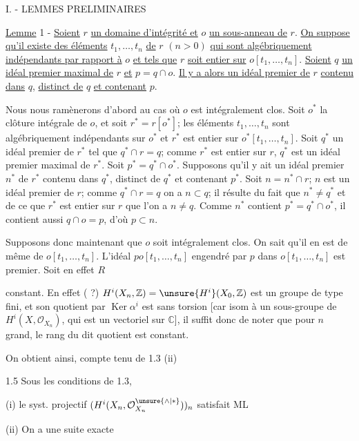 I. - LEMMES PRELIMINAIRES

\uline{Lemme} 1 - \uline{Soient} $r$ \uline{un domaine d'intégrité et} $o$ \uline{un sous-anneau de} $r$. \uline{On suppose qu'il existe des éléments} $t_1,\ldots,t_n$ \uline{de} $r$ $(n>0)$ \uline{qui sont algébriquement indépendants par rapport à} $o$ \uline{et tels que} $r$ \uline{soit entier sur} $o[t_1,\ldots,t_n]$. \uline{Soient} $q$ \uline{un idéal premier maximal de} $r$ \uline{et} $p=q\cap o$. \uline{Il y a alors un idéal premier de} $r$ \uline{contenu dans} $q$, \uline{distinct de} $q$ \uline{et contenant} $p$.

Nous nous ramènerons d'abord au cas où $o$ est intégralement clos. Soit $o^*$ la clôture intégrale de $o$, et soit $r^*=r[o^*]$; les éléments $t_1,\ldots,t_n$ sont algébriquement indépendants sur $o^*$ et $r^*$ est entier sur $o^*[t_1,\ldots,t_n]$. Soit $q^*$ un idéal premier de $r^*$ tel que $q^*\cap r=q$; comme $r^*$ est entier sur $r$, $q^*$ est un idéal premier maximal de $r^*$. Soit $p^*=q^*\cap o^*$. Supposons qu'il y ait un idéal premier $n^*$ de $r^*$ contenu dans $q^*$, distinct de $q^*$ et contenant $p^*$. Soit $n=n^*\cap r$; $n$ est un idéal premier de $r$; comme $q^*\cap r=q$ on a $n\subset q$; il résulte du fait que $n^*\ne q^*$ et de ce que $r^*$ est entier sur $r$ que l'on a $n\ne q$. Comme $n^*$ contient $p^*=q^*\cap o^*$, il contient aussi $q\cap o=p$, d'où $p\subset n$.

Supposons donc maintenant que $o$ soit intégralement clos. On sait qu'il en est de même de $o[t_1,\ldots,t_n]$. L'idéal $po[t_1,\ldots,t_n]$ engendré par $p$ dans $o[t_1,\ldots,t_n]$ est premier. Soit en effet $R$

constant. En effet ( ?) $H^i(X_n,\mathbb Z)=\unsure{H^i}(X_0,\mathbb Z)$ est un groupe de type fini, et son quotient par $\operatorname{Ker}\alpha^i$ est sans torsion [car isom à un sous-groupe de $H^i(X,\mathcal O_{X_n})$, qui est un vectoriel sur $\mathbb C$],  il suffit donc de noter que pour $n$ grand, le rang du dit quotient est constant.

On obtient ainsi, compte tenu de 1.3 (ii) 

\uline{} 1.5 Sous les conditions de 1.3,

(i) le syst. projectif $(H^i(X_n,\mathcal O_{X_n}^{\unsure{\wedge|*}}))_n$ satisfait ML

(ii) On a une suite exacte
\margin{\deleted{\unsure{*}}}


